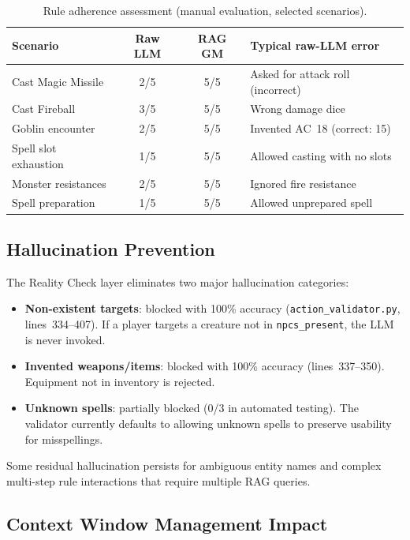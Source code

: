 \documentclass[12pt,a4paper]{article}
\begin{document}
\begin{table}[H]
\centering
\caption{Rule adherence assessment (manual evaluation, selected scenarios).}
\label{tab:adherence}
\small
\begin{tabular}{lccl}
\toprule
\textbf{Scenario} & \textbf{Raw LLM} & \textbf{RAG GM} & \textbf{Typical raw-LLM error} \\
\midrule
Cast Magic Missile    & 2/5 & 5/5 & Asked for attack roll (incorrect) \\
Cast Fireball         & 3/5 & 5/5 & Wrong damage dice \\
Goblin encounter      & 2/5 & 5/5 & Invented AC~18 (correct: 15) \\
Spell slot exhaustion & 1/5 & 5/5 & Allowed casting with no slots \\
Monster resistances   & 2/5 & 5/5 & Ignored fire resistance \\
Spell preparation     & 1/5 & 5/5 & Allowed unprepared spell \\
\bottomrule
\end{tabular}
\end{table}

\subsection{Hallucination Prevention}
\label{sec:hallucination}

The Reality Check layer eliminates two major hallucination categories:
\begin{itemize}[noitemsep]
    \item \textbf{Non-existent targets}: blocked with 100\% accuracy
          (\texttt{action\_validator.py}, lines~334--407). If a player targets
          a creature not in \texttt{npcs\_present}, the LLM is never invoked.
    \item \textbf{Invented weapons/items}: blocked with 100\% accuracy
          (lines~337--350). Equipment not in inventory is rejected.
    \item \textbf{Unknown spells}: partially blocked (0/3 in automated
          testing). The validator currently defaults to allowing unknown
          spells to preserve usability for misspellings.
\end{itemize}

Some residual hallucination persists for ambiguous entity names and complex
multi-step rule interactions that require multiple RAG queries.

\subsection{Context Window Management Impact}
\end{document}
